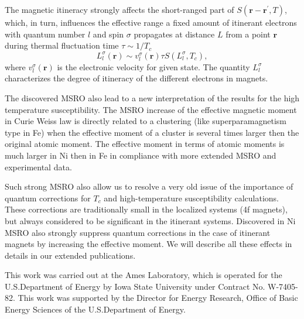 \documentclass[aps,preprint,twocolumn,10pt]{revtex4}%
\begin{document}
The magnetic itineracy strongly affects the short-ranged part of
$S(\mathbf{r}-\mathbf{r}^{\prime},T)$, which, in turn, influences the
effective range a fixed amount of itinerant electrons with quantum number $l$
and spin $\sigma$ propagates at distance $L$ from a point $\mathbf{r}$ during
thermal fluctuation time $\tau\sim1/T_{c}$%
\begin{equation}
L_{l}^{\sigma}\left(  \mathbf{r}\right)  \sim v_{l}^{\sigma}\left(
\mathbf{r}\right)  \tau S\left(  L_{l}^{\sigma},T_{c}\right)  , \label{a33}%
\end{equation}
where $v_{l}^{\sigma}\left(  \mathbf{r}\right)  $ is the electronic velocity
for given state. The quantity $L_{l}^{\sigma}$ characterizes the degree of
itineracy of the different electrons in magnets.

The discovered MSRO also lead to a new interpretation of the results for the
high temperature susceptibility. The MSRO increase of the effective magnetic
moment in Curie Weiss law is directly related to a clustering (like
superparamagnetism type in Fe) when the effective moment of a cluster is
several times larger then the original atomic moment. The effective moment in
terms of atomic moments is much larger in Ni then in Fe in compliance with
more extended MSRO and experimental data.

Such strong MSRO also allow us to resolve a very old issue of the importance
of quantum corrections for $T_{c}$ and high-temperature susceptibility
calculations. These corrections are traditionally small in the localized
systems (4f magnets), but always considered to be significant in the itinerant
systems. Discovered in Ni MSRO also strongly suppress quantum corrections in
the case of itinerant magnets by increasing the effective moment. We will
describe all these effects in details in our extended publications.

This work was carried out at the Ames Laboratory, which is operated for the
U.S.Department of Energy by Iowa State University under Contract No.
W-7405-82. This work was supported by the Director for Energy Research, Office
of Basic Energy Sciences of the U.S.Department of Energy.
\end{document}
